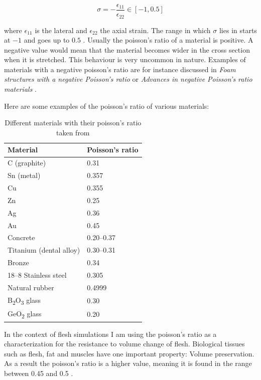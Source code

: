 \begin{equation}\label{eq:poisson}
\sigma = - \frac{\epsilon_{11}}{\epsilon_{22}} \in [-1, 0.5]
\end{equation}

where $\epsilon_{11}$ is the lateral and $\epsilon_{22}$ the axial strain. The range in which $\sigma$ lies in starts at $-1$ and goes up to $0.5$ \cite{PhysRevB.80.132104}. Usually the poisson's ratio of a material is positive. A negative value would mean that the material becomes wider in the cross section when it is stretched. This behaviour is very uncommon in nature. Examples of materials with a negative poisson's ratio are for instance discussed in \textit{Foam structures with a negative Poisson's ratio} \cite{lakes1987foam} or \textit{Advances in negative Poisson's ratio materials} \cite{lakes1993advances}.

Here are some examples of the poisson's ratio of various materials:

\begin{table}[!htbp]
\centering
    \begin{tabular}{ | l | l |}
    \hline
    \textbf{Material} & \textbf{Poisson's ratio} \\ \hline
    C (graphite) & 0.31 \\ \hline
    Sn (metal) & 0.357 \\ \hline
    Cu & 0.355 \\ \hline
    Zn & 0.25 \\ \hline
    Ag & 0.36 \\ \hline
    Au & 0.45 \\ \hline
    Concrete & 0.20–0.37 \\ \hline
    Titanium (dental alloy) & 0.30–0.31 \\ \hline
    Bronze & 0.34 \\ \hline
    18–8 Stainless steel & 0.305 \\ \hline
    Natural rubber & 0.4999 \\ \hline
	B\textsubscript{2}O\textsubscript{3} glass & 0.30 \\ \hline
	GeO\textsubscript{2} glass & 0.20 \\ \hline	
    \end{tabular}
    \caption{Different materials with their poisson's ratio taken from \cite{PhysRevB.80.132104}}
\label{table:1}
\end{table}

In the context of flesh simulations I am using the poisson's ratio as a characterization for the resistance to volume change of flesh. Biological tissues such as flesh, fat and muscles have one important property: Volume preservation. As a result the poisson's ratio is a higher value, meaning it is found in the range between 0.45 and 0.5 \cite{Smith:2018:SNF:3191713.3180491}.

